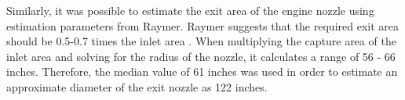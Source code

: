 Similarly, it was possible to estimate the exit area of the engine nozzle using estimation parameters from Raymer. Raymer suggests that the required exit area should be 0.5-0.7 times the inlet area \cite{raymer}. When multiplying the capture area of the inlet area and solving for the radius of the nozzle, it calculates a range of 56 - 66 inches. Therefore, the median value of 61 inches was used in order to estimate an approximate diameter of the exit nozzle as 122 inches.




